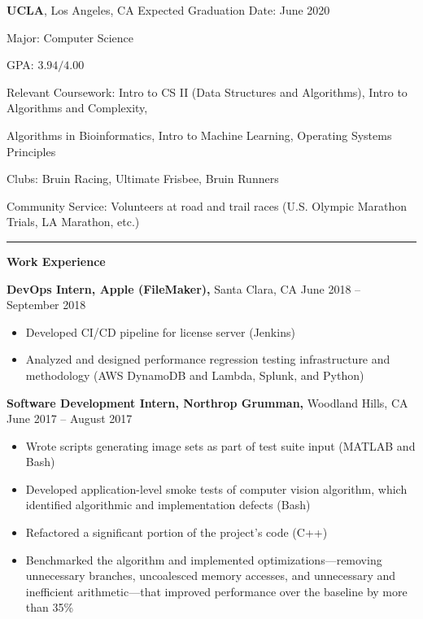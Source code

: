\documentclass[11pt]{article}
\begin{document}
\textbf{UCLA}, Los Angeles, CA \hfill Expected Graduation Date: June 2020 \setlength{\parindent}{3em}\par
Major: Computer Science\par
GPA: $3.94/4.00$ \par %
Relevant Coursework: Intro to CS II (Data Structures and Algorithms), Intro to Algorithms and Complexity, \setlength{\parindent}{4.5em}\par Algorithms in Bioinformatics, Intro to Machine Learning, Operating Systems Principles\setlength{\parindent}{3em}\par
Clubs: Bruin Racing, Ultimate Frisbee, Bruin Runners\par
Community Service: Volunteers at road and trail races (U.S. Olympic Marathon Trials, LA Marathon, etc.)\vspace{6pt}\setlength{\parindent}{0 em}\par
\rule[10pt]{\textwidth}{.75pt} \vspace{-20pt}
\setlength{\parindent}{0.55em}\par
\textbf{\Large Work Experience} \vspace{4pt}
\setlength{\parindent}{1.5em}\par
\textbf{DevOps Intern, Apple (FileMaker),} Santa Clara, CA \hfill June 2018 -- September 2018 \vspace{-6pt} \setlength{\parindent}{3em}\par
\begin{itemize}[leftmargin=15.2mm]
	\setlength\itemsep{-.4em}
	\item Developed CI/CD pipeline for license server (Jenkins) 
	\item Analyzed and designed performance regression testing infrastructure and methodology (AWS DynamoDB and Lambda, Splunk, and Python)
\end{itemize} \setlength{\parindent}{1.5em}\par \vspace{-6pt}
\textbf{Software Development Intern, Northrop Grumman,} Woodland Hills, CA \hfill June 2017 -- August 2017 \vspace{-6pt} \setlength{\parindent}{3em}\par
\begin{itemize}[leftmargin=15.2mm]
	\setlength\itemsep{-.4em}
	\item Wrote scripts generating image sets as part of test suite input (MATLAB and Bash)
	\item Developed application-level smoke tests of computer vision algorithm, which identified algorithmic and implementation defects (Bash)
	\item Refactored a significant portion of the project's code (C++)
	\item Benchmarked the algorithm and implemented optimizations---removing unnecessary branches, uncoalesced memory accesses, and unnecessary and inefficient arithmetic---that improved performance over the baseline by more than 35\%
\end{itemize}
\end{document}
